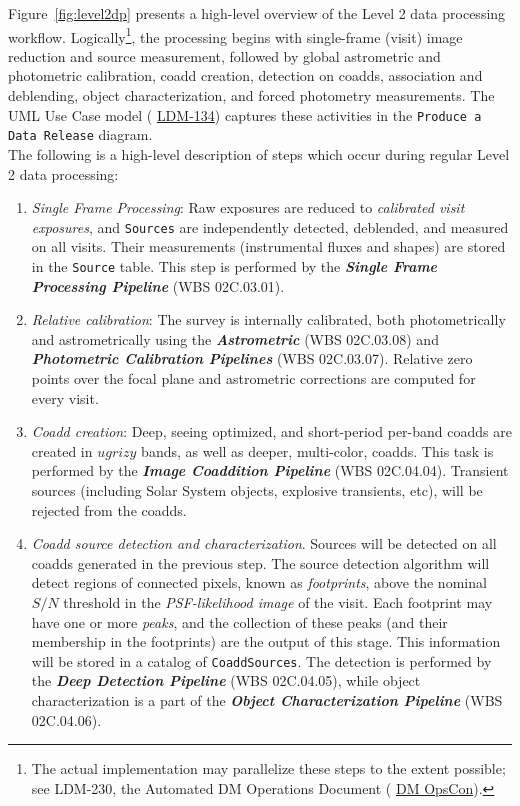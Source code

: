 \documentclass[12pt]{article}
\newcommand{\code}[1]{\texttt{#1}}
\newcommand{\Source}{\code{Source}\xspace}
\newcommand{\Sources}{\code{Sources}\xspace}
\newcommand{\CoaddSources}{\code{CoaddSources}\xspace}
\newcommand{\ds}[2]{{\color{blue} \href{https://docushare.lsstcorp.org/docushare/dsweb/Get/#1}{#2}}\xspace}
\newcommand{\appsUML}{\ds{LDM-134}{LDM-134}}
\newcommand{\DMOps}{\ds{LDM-230}{DM OpsCon}}
\newcommand{\wbsSFM}{WBS 02C.03.01}
\newcommand{\wbsCoadd}{WBS 02C.04.04}
\newcommand{\wbsDeepDet}{WBS 02C.04.05}
\newcommand{\wbsObjChar}{WBS 02C.04.06}
\newcommand{\wbsPhotoCal}{WBS 02C.03.07}
\newcommand{\wbsAstroCal}{WBS 02C.03.08}
\newcommand{\uc}[1]{{\tt #1}}
\begin{document}
Figure~\ref{fig:level2dp} presents a high-level overview of the Level 2 data processing workflow. Logically\footnote{The actual implementation may parallelize these steps to the extent possible; see LDM-230, the Automated DM Operations Document (\DMOps).}, the processing begins with single-frame (visit) image reduction and source measurement, followed by global astrometric and photometric calibration, coadd creation, detection on coadds, association and deblending, object characterization, and forced photometry measurements. The UML Use Case model (\appsUML) captures these activities in the \uc{Produce a Data Release} diagram.
\\

The following is a high-level description of steps which occur during regular Level 2 data processing:
\begin{enumerate}
    \item {\em Single Frame Processing}: Raw exposures are reduced to {\em calibrated visit exposures}, and \Sources are independently detected, deblended, and measured on all visits. Their measurements (instrumental fluxes and shapes) are stored in the \Source table. This step is performed by the {\bf \em Single Frame Processing Pipeline} (\wbsSFM).
    \item {\em Relative calibration}: The survey is internally calibrated, both photometrically and astrometrically using the {\bf \em Astrometric} (\wbsAstroCal) and {\bf \em Photometric Calibration Pipelines} (\wbsPhotoCal). Relative zero points over the focal plane and astrometric corrections are computed for every visit.
    \item {\em Coadd creation}: Deep, seeing optimized, and short-period per-band coadds are created in $ugrizy$ bands, as well as deeper, multi-color, coadds. This task is performed by the {\bf \em Image Coaddition Pipeline} (\wbsCoadd). Transient sources (including Solar System objects, explosive transients, etc), will be rejected from the coadds.
    \item {\em Coadd source detection and characterization}. Sources will be detected on all coadds generated in the previous step. The source detection algorithm will detect regions of connected pixels, known as {\em footprints}, above the nominal $S/N$ threshold in the {\em PSF-likelihood image} of the visit. Each footprint may have one or more {\em peaks}, and the collection of these peaks (and their membership in the footprints) are the output of this stage. This information will be stored in a catalog of \CoaddSources. The detection is performed by the {\bf \em Deep Detection Pipeline} (\wbsDeepDet), while object characterization is a part of the {\bf \em Object Characterization Pipeline} (\wbsObjChar).

\end{enumerate}
\end{document}
